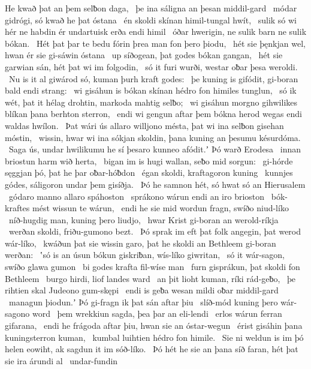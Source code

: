 He kwað þat an þem selƀon daga, \hld\ þe ina sáligna
an þesan middil-gard \hld\ módar gidrógi,
só kwað he þat óstana \hld\ én skoldi skínan
himil-tungal hwít, \hld\ sulik só wi hér ne habdin ér
undartuisk erða endi himil \hld\ óðar hwerigin,
ne sulik barn ne sulik bókan. \hld\ Hét þat þar te bedu fórin
þrea man fon þero þiodu, \hld\ hét sie þęnkjan wel,
hwan ér sie gi-sáwin óstana \hld\ up síðogean,
þat godes bókan gangan, \hld\ hét sie garwian sán,
hét þat wi im folgodin, \hld\ só it furi wurði,
westar oƀar þesa weroldi. \hld\ Nu is it al giwárod só,
kuman þurh kraft godes: \hld\ þe kuning is gifódit,
gi-boran bald endi strang: \hld\ wi gisáhun is bókan skínan
hédro fon himiles tunglun, \hld\ só ik wét, þat it hélag drohtin,
markoda mahtig selƀo; \hld\ wi gisáhun morgno gihwilikes
blíkan þana berhton sterron, \hld\ endi wi gengun aftar þem bókna herod
wegas endi waldas hwílon. \hld\ Þat wári ús allaro willjono mésta,
þat wi ina selƀon gisehan móstin, \hld\ wissin, hwar wi ina sókjan skoldin,
þana kuning an þesumu késurdóma. \hld\ Saga ús, undar hwilikumu he sí þesaro kunneo afódit.ʼ
Þó warð Erodesa \hld\ innan briostun
harm wið herta, \hld\ bigan im is hugi wallan,
seƀo mid sorgun: \hld\ gi-hórde sęggjan þó,
þat he þar oƀar-hóƀdon \hld\ égan skoldi,
kraftagoron kuning \hld\ kunnjes gódes,
sáligoron undar þem gisíðja. \hld\ Þó he samnon hét,
só hwat só an Hierusalem \hld\ gódaro manno
allaro spáhoston \hld\ sprákono wárun
endi an iro brioston \hld\ bók-kraftes mést
wissun te wárun, \hld\ endi he sie mid wordun fragn,
swíðo niud-líko \hld\ níð-hugdig man,
kuning þero liudjo, \hld\ hwar Krist gi-boran
an werold-ríkja \hld\ werðan skoldi,
friðu-gumono bezt. \hld\ Þó sprak im eft þat folk angegin,
þat werod wár-líko, \hld\ kwáðun þat sie wissin garo,
þat he skoldi an Bethleem gi-boran werðan: \hld\ ʽsó is an úsun bókun giskriƀan,
wís-líko giwritan, \hld\ só it wár-sagon,
swíðo glawa gumon \hld\ bi godes krafta
fil-wíse man \hld\ furn gisprákun,
þat skoldi fon Bethleem \hld\ burgo hirdi,
liof landes ward \hld\ an þit lioht kuman,
ríki rád-geƀo, \hld\ þe rihtien skal
Judeono gum-skępi \hld\ endi is geƀa wesan
mildi oƀar middil-gard \hld\ managun þiodun.ʼ
Þó gi-fragn ik þat sán aftar þiu \hld\ slíð-mód kuning
þero wár-sagono word \hld\ þem wrekkiun sagda,
þea þar an eli-lendi \hld\ erlos wárun
ferran gifarana, \hld\ endi he frágoda aftar þiu,
hwan sie an óstar-wegun \hld\ érist gisáhin
þana kuningsterron kuman, \hld\ kumbal luihtien
hédro fon himile. \hld\ Sie ni weldun is im þó helen eowiht,
ak sagdun it im sóð-líko. \hld\ Þó hét he sie an þana síð faran,
hét þat sie ira árundi al \hld\ undar-fundin
